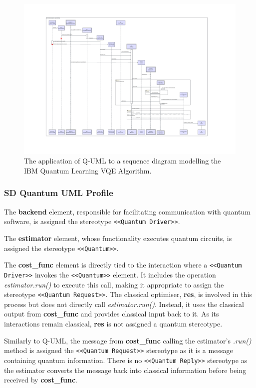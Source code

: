 \documentclass{article}
\begin{document}
\begin{figure}
    \centering
    \includegraphics[width=1\linewidth]{VQE QUML SD Final Version.pdf}
    \caption{The application of Q-UML to a sequence diagram modelling the IBM Quantum Learning VQE Algorithm.}
    \label{fig:Q-UML_SD}
\end{figure}

\subsubsection{SD Quantum UML Profile}

The \textbf{backend} element, responsible for facilitating communication with quantum software, is assigned the stereotype \texttt{<<Quantum Driver>>}.

The \textbf{estimator} element, whose functionality executes quantum circuits, is assigned the stereotype \texttt{<<Quantum>>}.

The \textbf{cost\_func} element is directly tied to the interaction where a \texttt{<<Quantum Driver>>} invokes the \texttt{<<Quantum>>} element. It includes the operation \textit{estimator.run()} to execute this call, making it appropriate to assign the stereotype \texttt{<<Quantum Request>>}. The classical optimiser, \textbf{res}, is involved in this process but does not directly call \textit{estimator.run()}. Instead, it uses the classical output from \textbf{cost\_func} and provides classical input back to it. As its interactions remain classical, \textbf{res} is not assigned a quantum stereotype.

Similarly to Q-UML, the message from \textbf{cost\_func} calling the estimator's \textit{.run()} method is assigned the \texttt{<<Quantum Request>>} stereotype as it is a message containing quantum information. There is no \texttt{<<Quantum Reply>>} stereotype as the estimator converts the message back into classical information before being received by \textbf{cost\_func}.
\end{document}
